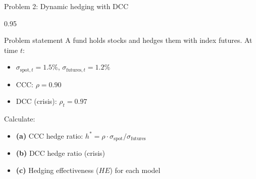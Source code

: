 \documentclass[9pt, aspectratio=169, t]{beamer}
\begin{document}
\begin{frame}{Problem 2: Dynamic hedging with DCC}
    \begin{cminipage}{0.95\textwidth}
    \begin{block}{Problem statement}
        A fund holds stocks and hedges them with index futures. At time $t$:
        \begin{itemize}\setlength{\itemsep}{0pt}
            \item $\sigma_{\text{spot},t} = 1.5\%$, $\sigma_{\text{futures},t} = 1.2\%$
            \item CCC: $\rho = 0.90$
            \item DCC (crisis): $\rho_t = 0.97$
        \end{itemize}

        \vspace{0.3cm}
        Calculate:
        \begin{itemize}\setlength{\itemsep}{0pt}
            \item \textbf{(a)} CCC hedge ratio: $h^* = \rho \cdot \sigma_{\text{spot}} / \sigma_{\text{futures}}$
            \item \textbf{(b)} DCC hedge ratio (crisis)
            \item \textbf{(c)} Hedging effectiveness ($HE$) for each model
        \end{itemize}
    \end{block}
    \end{cminipage}
\end{frame}
\end{document}
